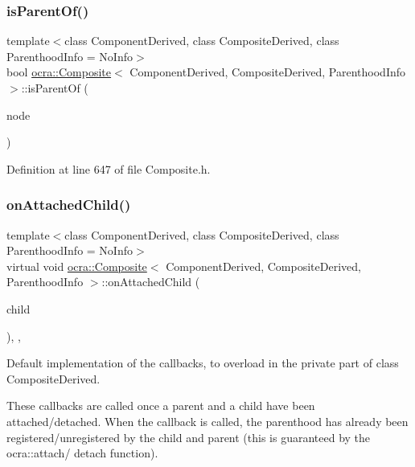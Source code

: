 \subsubsection{\texorpdfstring{is\+Parent\+Of()}{isParentOf()}}
{\footnotesize\ttfamily template$<$class Component\+Derived, class Composite\+Derived, class Parenthood\+Info = No\+Info$>$ \\
bool \hyperlink{classocra_1_1Composite}{ocra\+::\+Composite}$<$ Component\+Derived, Composite\+Derived, Parenthood\+Info $>$\+::is\+Parent\+Of (\begin{DoxyParamCaption}\item[{const Component\+Derived \&}]{node }\end{DoxyParamCaption})\hspace{0.3cm}{\ttfamily [inline]}}



Definition at line 647 of file Composite.\+h.

\hypertarget{classocra_1_1Composite_a9937c32827a7c7f3caede800fbe7741e}{}\label{classocra_1_1Composite_a9937c32827a7c7f3caede800fbe7741e} 
\subsubsection{\texorpdfstring{on\+Attached\+Child()}{onAttachedChild()}}
{\footnotesize\ttfamily template$<$class Component\+Derived, class Composite\+Derived, class Parenthood\+Info = No\+Info$>$ \\
virtual void \hyperlink{classocra_1_1Composite}{ocra\+::\+Composite}$<$ Component\+Derived, Composite\+Derived, Parenthood\+Info $>$\+::on\+Attached\+Child (\begin{DoxyParamCaption}\item[{const \hyperlink{classocra_1_1Parenthood}{parenthood\+\_\+t\+\_\+} \&}]{child }\end{DoxyParamCaption})\hspace{0.3cm}{\ttfamily [inline]}, {\ttfamily [protected]}, {\ttfamily [virtual]}}



Default implementation of the callbacks, to overload in the private part of class Composite\+Derived. 

These callbacks are called once a parent and a child have been attached/detached. When the callback is called, the parenthood has already been registered/unregistered by the child and parent (this is guaranteed by the ocra\+::attach/ detach function). 

